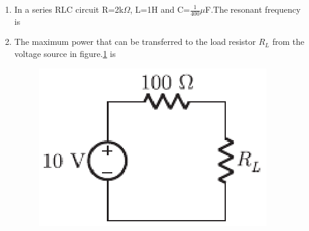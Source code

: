 \documentclass[journal,12pt,twocolumn]{IEEEtran}
\begin{document}
\begin{enumerate}
\item In a series RLC circuit R=2k$\Omega$, L=1H and C=$\frac{1}{400}\mu$F.The resonant frequency is
\begin{enumerate}
\setlength\itemsep{2em}
\end{enumerate}

\item The maximum power that can be transferred to the load resistor $ R_{L}$ from the
voltage source in figure.\ref{fig58} is
\begin{enumerate}
\setlength\itemsep{2em}
\begin{figure}[!h]
\begin{center}
\includegraphics[scale=0.8]{./figs/fig58.eps}
\caption{}
\label{fig58}
\end{center}
\end{figure}
\end{enumerate}


\end{enumerate}
\end{document}
